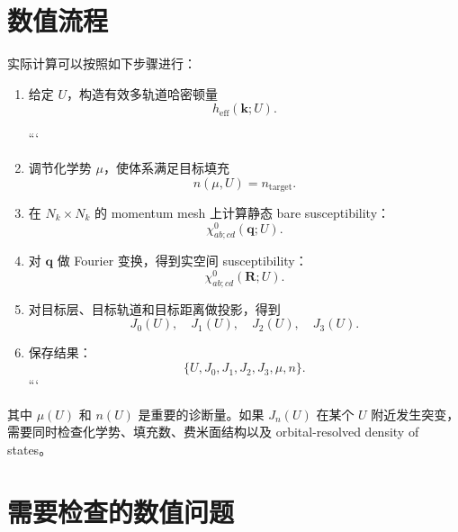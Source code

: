 \documentclass[UTF8,11pt]{ctexart}
\begin{document}
\section{数值流程}

实际计算可以按照如下步骤进行：

\begin{enumerate}
    \item 给定 $U$，构造有效多轨道哈密顿量
          \begin{equation}
              h_{\mathrm{eff}}(\mathbf k;U).
          \end{equation}

          ```
    \item 调节化学势 $\mu$，使体系满足目标填充
          \begin{equation}
              n(\mu,U)=n_{\mathrm{target}}.
          \end{equation}

    \item 在 $N_k\times N_k$ 的 momentum mesh 上计算静态 bare susceptibility：
          \begin{equation}
              \chi^{0}_{ab;cd}(\mathbf q;U).
          \end{equation}

    \item 对 $\mathbf q$ 做 Fourier 变换，得到实空间 susceptibility：
          \begin{equation}
              \chi^{0}_{ab;cd}(\mathbf R;U).
          \end{equation}

    \item 对目标层、目标轨道和目标距离做投影，得到
          \begin{equation}
              J_0(U),\quad J_1(U),\quad J_2(U),\quad J_3(U).
          \end{equation}

    \item 保存结果：
          \begin{equation}
              \{U,J_0,J_1,J_2,J_3,\mu,n\}.
          \end{equation}
          ```

\end{enumerate}

其中 $\mu(U)$ 和 $n(U)$ 是重要的诊断量。如果 $J_n(U)$ 在某个 $U$ 附近发生突变，需要同时检查化学势、填充数、费米面结构以及 orbital-resolved density of states。

\section{需要检查的数值问题}
\end{document}
